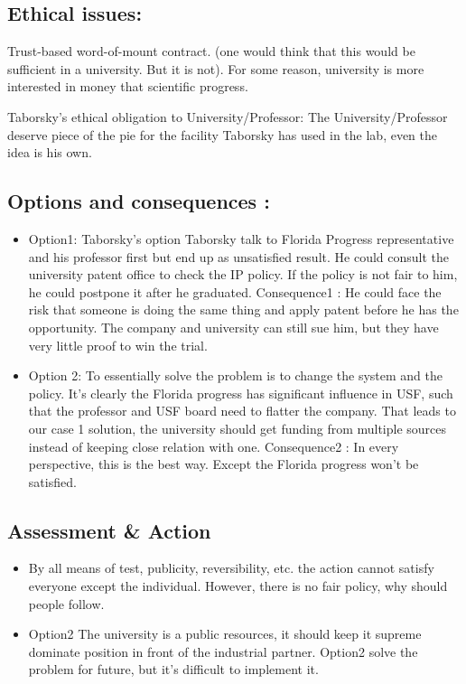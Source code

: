 \documentclass[draft,11pt,openright,monochrome,british,a4paper]{scrartcl}
\begin{document}
\subsection*{Ethical issues:}
Trust-based word-of-mount contract. (one would think that this would be sufficient in a university. But it is not). For some reason, university is more interested in money that scientific progress.

Taborsky's ethical obligation to University/Professor:
The University/Professor deserve piece of the pie for the facility Taborsky has used in the lab, even the idea is his own.

\subsection*{Options and consequences :}
\begin{itemize}
\item Option1: Taborsky's option
Taborsky talk to Florida Progress representative and his professor first but end up as unsatisfied result. He could consult the university patent office to check the IP policy. If the policy is not fair to him, he could postpone it after he graduated.
Consequence1 : He could face the risk that someone is doing the same thing and apply patent before he has the opportunity. The company and university can still sue him, but they have very little proof to win the trial.

\item Option 2: To essentially solve the problem is to change the system and the policy. It's clearly the Florida progress has significant influence in USF, such that the professor and USF board need to flatter the company.
That leads to our case 1 solution, the university should get funding from multiple sources instead of keeping close relation with one.
Consequence2 : In every perspective, this is the best way. Except the Florida progress won't be satisfied.
 \end{itemize}
 
\subsection*{Assessment \& Action}
\begin{itemize}
\item By all means of test, publicity, reversibility, etc. the action cannot satisfy everyone except the individual. However, there is no fair policy, why should people follow.
\item Option2
The university is a public resources, it should keep it supreme dominate position in front of the industrial partner. Option2 solve the problem for future, but it's difficult to implement it.
 \end{itemize}




\end{document}
